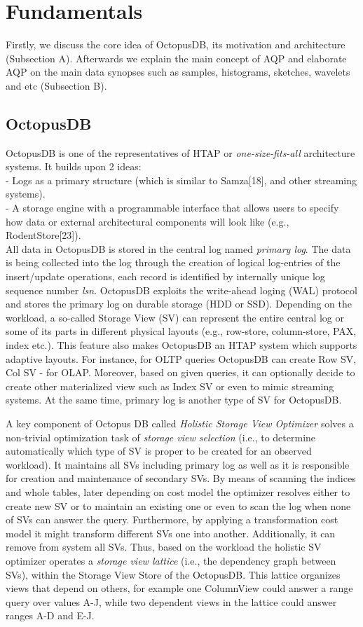\documentclass[10pt, conference, compsocconf]{IEEEtran}
\begin{document}
\section{Fundamentals}
Firstly, we discuss the core idea of OctopusDB, its motivation and  architecture (Subsection A). Afterwards we explain the main concept of AQP and elaborate AQP on the main data synopses such as samples, histograms, sketches, wavelets and etc (Subsection B).
\subsection{OctopusDB}
OctopusDB is one of the representatives of HTAP or \textit{one-size-fits-all} architecture systems. 
It builds upon 2 ideas:\\
- Logs as a primary structure (which is similar to Samza[18], and other streaming systems).\\
- A storage engine with a programmable interface that allows users to specify how data or external architectural components will look like (e.g., RodentStore[23]).\\
All data in OctopusDB is stored in the central log named \textit{primary log}. The data is being collected into the log through the creation of logical log-entries of the insert/update operations, each record is identified by internally unique log sequence number \textit{lsn}. OctopusDB exploits the write-ahead loging (WAL) protocol and stores the primary log on durable storage (HDD or SSD). Depending on the workload, a so-called Storage View (SV) can represent the entire central log or some of its parts in different physical layouts (e.g., row-store, column-store, PAX, index etc.). This feature also makes OctopusDB  an HTAP system which supports adaptive layouts.
For instance, for OLTP queries OctopusDB can create Row SV, Col SV - for OLAP. Moreover, based on given queries, it can optionally decide to create other materialized view such as Index SV or even to mimic streaming systems. At the same time, primary log is another type of SV for OctopusDB.  

A key component of Octopus DB called \textit{Holistic Storage View Optimizer} solves a non-trivial optimization task of \textit{storage view selection} (i.e., to determine automatically which type of SV is proper to be created for an observed workload). It maintains all SVs including primary log as well as it is responsible for creation and maintenance of secondary SVs. By means of scanning the indices and whole tables, later  depending on cost model the optimizer resolves either to create new SV or to maintain an existing one or even to scan the log when none of SVs can answer the query. Furthermore, by applying a transformation cost model it might transform different SVs one into another. Additionally, it can remove from system all SVs. Thus, based on the workload the holistic SV optimizer operates a \textit{storage view lattice} (i.e., the dependency graph between SVs), within the Storage View Store of the OctopusDB. This lattice organizes views that depend on others, for example one ColumnView could answer a range query over values A-J, while two dependent views in the lattice could answer ranges A-D and E-J.
\end{document}
